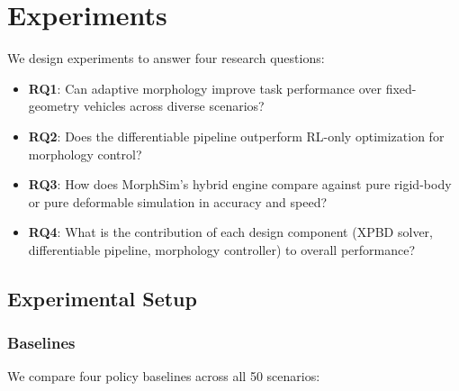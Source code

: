 \section{Experiments}

We design experiments to answer four research questions:
\begin{itemize}
    \item \textbf{RQ1}: Can adaptive morphology improve task performance over fixed-geometry vehicles across diverse scenarios?
    \item \textbf{RQ2}: Does the differentiable pipeline outperform RL-only optimization for morphology control?
    \item \textbf{RQ3}: How does MorphSim's hybrid engine compare against pure rigid-body or pure deformable simulation in accuracy and speed?
    \item \textbf{RQ4}: What is the contribution of each design component (XPBD solver, differentiable pipeline, morphology controller) to overall performance?
\end{itemize}

\subsection{Experimental Setup}

\subsubsection{Baselines}
We compare four policy baselines across all 50 scenarios:

